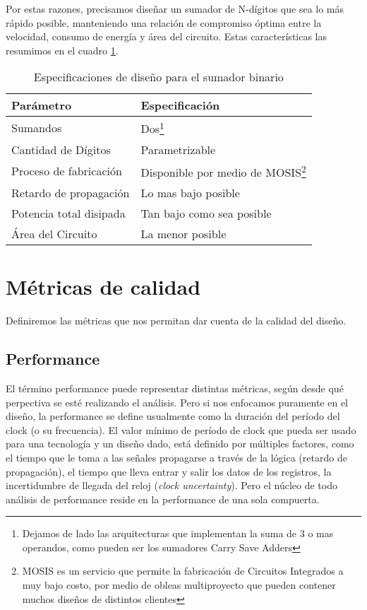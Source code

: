 Por estas razones, precisamos diseñar un sumador de N-dígitos que sea lo más rápido posible, manteniendo una relación de compromiso óptima entre la velocidad, consumo de energía y área del circuito.
Estas características las resumimos en el cuadro \ref{tabla_especifaciones}.
\begin{savenotes}
\begin{table}[h]
\centering
\begin{tabular}{@{}ll@{}}
\toprule
\textbf{Parámetro}  & \textbf{Especificación} \\ \midrule
Sumandos & Dos\footnote{Dejamos de lado las arquitecturas que implementan la suma de 3 o mas operandos, como pueden ser los sumadores Carry Save Adders} \\	
Cantidad de Dígitos & Parametrizable \\
Proceso de fabricación  & Disponible por medio de MOSIS\footnote{MOSIS es un servicio que permite la fabricación de Circuitos Integrados a muy bajo costo, por medio de obleas multiproyecto que pueden contener muchos diseños de distintos clientes} \\ 
Retardo de propagación  & Lo mas bajo posible                 \\
Potencia total disipada & Tan bajo como sea posible                 \\
Área del Circuito       & La menor posible                \\ \bottomrule
\end{tabular}
\caption{Especificaciones de diseño para el sumador binario}
\label{tabla_especifaciones}
\end{table}
\end{savenotes}


\section{Métricas de calidad}
Definiremos las métricas que nos permitan dar cuenta de la calidad del diseño.
\subsection{Performance}

El término performance puede representar distintas métricas, según desde qué perpectiva se esté realizando el análisis. Pero si nos enfocamos puramente en el diseño, la performance se define usualmente\cite{rabaey2003} como la duración del período del clock (o su frecuencia). El valor mínimo de período de clock que pueda ser usado para una tecnología y un diseño dado, está definido por múltiples factores, como el tiempo que le toma a las señales propagarse a través de la lógica (retardo de propagación), el tiempo que lleva entrar y salir los datos de los registros, la incertidumbre de llegada del reloj (\emph{clock uncertainty}). Pero el núcleo de todo análisis de performance reside en la performance de una sola compuerta.

